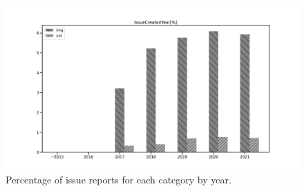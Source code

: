 \begin{figure}[h]
\centering
\includegraphics[width=0.6\linewidth]{./figures/data-category-trend.pdf}
\caption{ 
  Percentage of issue reports for each category by year. 
  }
\label{fig:data-cat-trend}
\end{figure}
